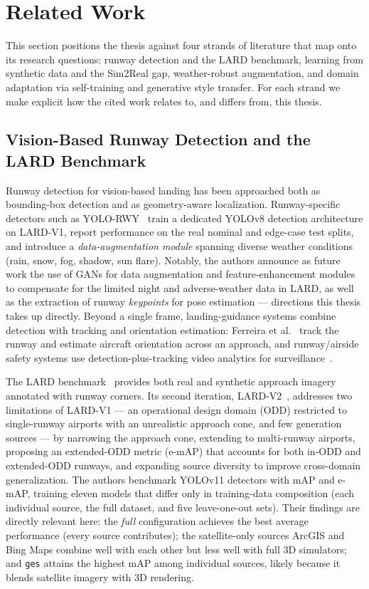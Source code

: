 \section{Related Work}
\label{sec:related-work}

This section positions the thesis against four strands of literature that map onto its
research questions: runway detection and the LARD benchmark, learning from synthetic
data and the Sim2Real gap, weather-robust augmentation, and domain adaptation via
self-training and generative style transfer. For each strand we make explicit how the
cited work relates to, and differs from, this thesis.

\subsection{Vision-Based Runway Detection and the LARD Benchmark}
\label{subsec:rw-runway}
Runway detection for vision-based landing has been approached both as bounding-box
detection and as geometry-aware localization. Runway-specific detectors such as
YOLO-RWY~\cite{yolorwy2024} train a dedicated YOLOv8 detection architecture on LARD-V1,
report performance on the real nominal and edge-case test splits, and introduce a
\emph{data-augmentation module} spanning diverse weather conditions (rain, snow, fog,
shadow, sun flare). Notably, the authors announce as future work the use of GANs for
data augmentation and feature-enhancement modules to compensate for the limited night
and adverse-weather data in LARD, as well as the extraction of runway
\emph{keypoints} for pose estimation --- directions this thesis takes up directly.
Beyond a single frame, landing-guidance systems combine detection with tracking and
orientation estimation: Ferreira et al.~\cite{ferreira2025landing} track the runway and
estimate aircraft orientation across an approach, and runway/airside safety systems use
detection-plus-tracking video analytics for surveillance~\cite{runwaysurveillance2026}.

The LARD benchmark~\cite{lard2023} provides both real and synthetic approach imagery
annotated with runway corners. Its second iteration, LARD-V2~\cite{syntheticrunway2025},
addresses two limitations of LARD-V1 --- an operational design domain (ODD) restricted
to single-runway airports with an unrealistic approach cone, and few generation sources
--- by narrowing the approach cone, extending to multi-runway airports, proposing an
extended-ODD metric (e-mAP) that accounts for both in-ODD and extended-ODD runways, and
expanding source diversity to improve cross-domain generalization. The authors benchmark
YOLOv11 detectors with mAP and e-mAP, training eleven models that differ only in
training-data composition (each individual source, the full dataset, and five
leave-one-out sets). Their findings are directly relevant here: the \emph{full}
configuration achieves the best average performance (every source contributes); the
satellite-only sources ArcGIS and Bing Maps combine well with each other but less well
with full 3D simulators; and \texttt{ges} attains the highest mAP among individual
sources, likely because it blends satellite imagery with 3D rendering.

